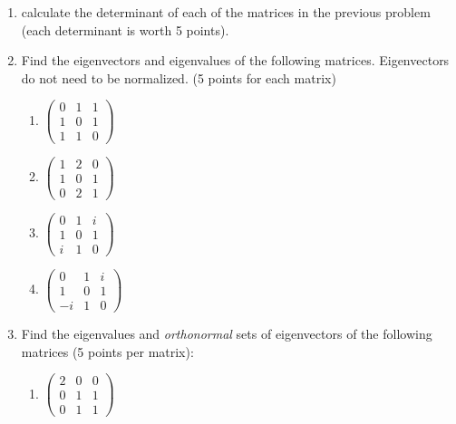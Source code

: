 \documentclass[fleqn]{article}
\begin{document}
\begin{enumerate}
  \item calculate the determinant of each of the matrices in the previous problem (each determinant is worth 5 points). 


  \item Find the eigenvectors and eigenvalues of the following matrices.  Eigenvectors do not need to be normalized. (5 points for each matrix)
    
  \begin{enumerate}
  \item  $\left( 
    \begin{array}{rrr}
    0 & 1 & 1 \\ 
    1 & 0 & 1 \\ 
    1 & 1 & 0
    \end{array}
    \right) $
    
    \item  $\left( 
    \begin{array}{rrr}
    1 & 2 & 0 \\ 
    1 & 0 & 1 \\ 
    0 & 2 & 1
    \end{array}
    \right) $
    
    \item  $\left( 
    \begin{array}{rrr}
    0 & 1 & i \\ 
    1 & 0 & 1 \\ 
    i & 1 & 0
    \end{array}
    \right) $
    
    \item  $\left( 
    \begin{array}{rrr}
    0 & 1 & i \\ 
    1 & 0 & 1 \\ 
    -i & 1 & 0
    \end{array}
    \right) $
    \end{enumerate}
    
    
  \item Find the eigenvalues and \emph{orthonormal} sets of eigenvectors of the following matrices (5 points per matrix):
    
  \begin{enumerate}
    \item  $\left( 
    \begin{array}{rrr}
    2 & 0 & 0 \\ 
    0 & 1 & 1 \\ 
    0 & 1 & 1
    \end{array}
    \right) $
    

\end{enumerate}
\end{enumerate}
\end{document}
